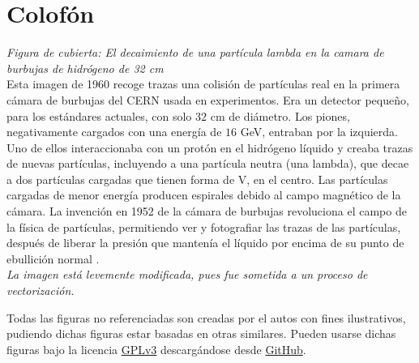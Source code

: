 \pagestyle{empty}

\hfill

\vfill


\section*{Colofón}


\textit{Figura de cubierta: El decaimiento de una partícula lambda en la camara de burbujas de hidrógeno de 32 cm} \\
Esta imagen de 1960  recoge trazas una colisión de partículas real en la primera cámara de burbujas del CERN usada en experimentos. Era un detector pequeño, para los estándares actuales, con solo $32$ cm de diámetro. Los piones, negativamente cargados con una energía de $16$ GeV, entraban por la izquierda. 
Uno de ellos interaccionaba con un protón en el hidrógeno líquido y creaba trazas de nuevas partículas, incluyendo a una partícula neutra (una lambda), que decae a dos partículas cargadas que tienen forma de V, en el centro. Las partículas cargadas de menor energía producen espirales debido al campo magnético de la cámara.
La invención en 1952 de la cámara de burbujas revoluciona el campo de la física de partículas, permitiendo ver y fotografiar las trazas de las partículas, después de liberar la presión que mantenía el líquido por encima de su punto de ebullición normal \cite{CERN-EX-11465}.\\
\textit{La imagen está levemente modificada, pues fue sometida a un proceso de vectorización.}

\bigskip

\noindent Todas las figuras no referenciadas son creadas por el autos con fines ilustrativos, pudiendo dichas figuras estar basadas en otras similares. Pueden usarse dichas figuras bajo la licencia \href{https://www.gnu.org/licenses/gpl.html}{GPLv3}  descargándose desde \href{https://github.com/marromlam/thesis-pictures.git}{GitHub}.


\bigskip

\small
\noindent\finalVersionString
\normalsize